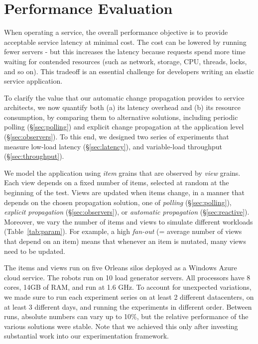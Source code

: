 \section{Performance Evaluation}\label{sec:evaluation}

When operating a service, the overall performance objective is to provide acceptable service latency at minimal cost. The cost can be lowered by running fewer servers - but this increases the latency because requests spend more time waiting for contended resources (such as network, storage, CPU, threads, locks, and so on). This tradeoff is an essential challenge for developers writing an elastic service application. 

To clarify the value that our automatic change propagation provides to service architects, we now quantify both (a) its latency overhead and (b) its resource consumption, by comparing them to alternative solutions, including periodic polling (\S\ref{sec:polling}) and explicit change propagation at the application level (\S\ref{sec:observers}). To this end, we designed two series of experiments that measure low-load latency (\S\ref{sec:latency}), and variable-load throughput (\S\ref{sec:throughput}).

We model the application using  \emph{item} grains that are observed by \emph{view} grains. Each view depends on a fixed number of items, selected at random at the beginning of the test. Views are updated when items change, in a manner that depends on the chosen propagation solution, one of \emph{polling} (\S\ref{sec:polling}), \emph{explicit propagation} (\S\ref{sec:observers}), or \emph{automatic propagation} (\S\ref{sec:reactive}). Moreover, we vary the number of items and views to simulate different workloads (Table~\ref{tab:param}).  For example, a high \emph{fan-out} (= average number of views that depend on an item) means that whenever an item is mutated, many views need to be updated. 

The items and views run on five Orleans silos deployed as a Windows Azure cloud service. The robots run on 10 load generator servers. All processors have 8 cores, 14GB of RAM, and run at 1.6 GHz. To account for unexpected variations, we made sure to run each experiment series on at least 2 different datacenters, on at least 3 different days, and running the experiments in different order. Between runs, absolute numbers can vary up to 10\%, but the relative performance of the various solutions were stable. Note that we achieved this only after investing substantial work into our experimentation framework. 

